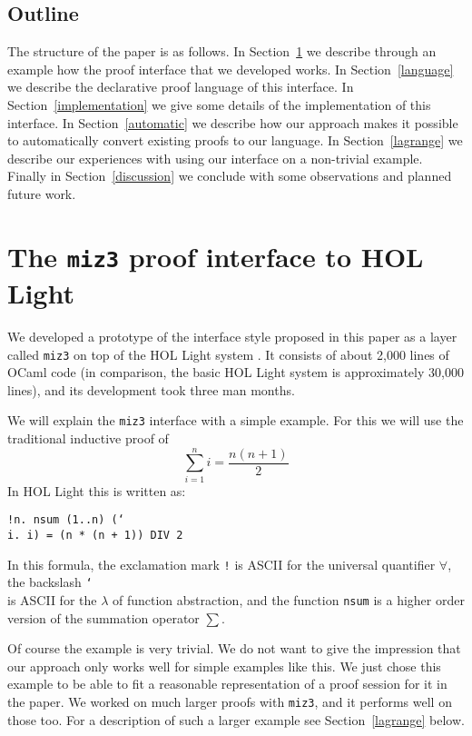 \documentclass{LMCS}
\let\xmedskip=\medskip
\def\lam{\char`\\}
\def\}{\char`\}}
\begin{document}
\subsection{Outline}

\noindent
The structure of the paper is as follows.
In Section~\ref{session} we describe through an example how the proof interface that
we developed works.
In Section~\ref{language} we describe the declarative proof language of this interface.
In Section~\ref{implementation} we give some details of the implementation of this
interface.
In Section~\ref{automatic} we describe how our approach makes it possible
to automatically convert existing proofs to our language.
In Section~\ref{lagrange} we describe our experiences with using our interface
on a non-trivial example.
Finally in Section~\ref{discussion} we conclude with some observations and
planned future work.


\section{The \texttt{miz3} proof interface to HOL Light}\label{session}

\noindent
We developed a prototype of the interface style proposed
in this paper as a layer called
\texttt{miz3} on top of the HOL Light system \cite{har:xx,har:00}.
It consists of about 2,000 lines of OCaml code (in comparison,
the basic HOL Light system is approximately 30,000 lines), and its
development took 
three man months.

We will explain the \texttt{miz3} interface with a simple
example.
For this we will use the traditional inductive proof of
$$\sum_{i = 1}^n i = \frac{n (n + 1)}{2}$$
In HOL Light this is written as:
\xmedskip
\begin{center}\small
\texttt{!n.\ nsum (1..n) ({\lam}i.\ i) = (n * (n + 1)) DIV 2}
\end{center}
\xmedskip
In this formula, the exclamation mark \texttt{!} is ASCII for the universal
quantifier $\forall$, the backslash \texttt{\lam} is ASCII for the
$\lambda$ of function abstraction,
and the function \texttt{nsum} is a higher order version of the summation operator $\sum$.

Of course the example is very trivial.
We do not want to give the impression that our approach only works well
for simple examples like this.
We just chose this example to be able to fit a reasonable representation
of a proof session for it in the paper.
We worked on much larger proofs with \texttt{miz3},
and it performs well on those too.
For a description of such a larger example see Section~\ref{lagrange} below.
\end{document}
